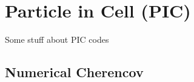 %
%

\chapter{Particle in Cell (PIC)}
\label{Apx:PIC}

Some stuff about PIC codes

\section{Numerical Cherencov}
\label{PIC:NumCher}
